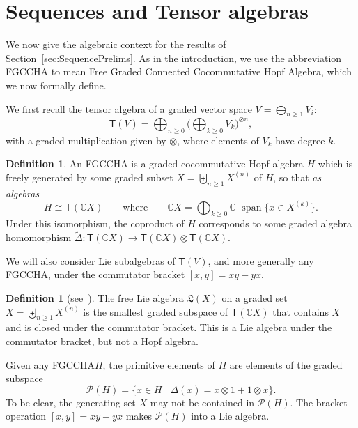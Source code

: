 \documentclass[11pt]{amsart}
\theoremstyle{definition}
\newtheorem{definition}[theorem]{Definition}
\numberwithin{equation}{section}
\def\CC{{\mathbb C}}
\newcommand{\FGCCHA}{\textsf{FGCCHA}\xspace}
\newcommand{\lucas}[1]{\todo[size=\tiny,color=red!50]{#1 \\ \hfill --- Lucas}}
\begin{document}
\section{Sequences and Tensor algebras}
\label{sec:HopfAlgebra}

We now give the algebraic context for the results of Section~\ref{sec:SequencePrelims}.  
As in the introduction, we use the abbreviation \FGCCHA to mean \textsf{F}ree \textsf{G}raded \textsf{C}onnected \textsf{C}ocommutative \textsf{H}opf \textsf{A}lgebra, which we now formally define.

We first recall the tensor algebra of a graded vector space $V = \bigoplus_{n \ge 1} V_{i}$:
\begin{equation}
\label{eq:tensoralg}
\mathsf{T}(V) = \bigoplus_{n \ge 0} \Big( \bigoplus_{k \ge 0} V_{k} \Big)^{\otimes n},
\end{equation}
with a graded multiplication given by $\otimes$, where elements of $V_{k}$ have degree $k$.  

\begin{definition}
\label{def:FGCCHA}
An \FGCCHA is a graded cocommutative Hopf algebra $H$ which is freely generated by some graded subset $X = \biguplus_{n \ge 1} X^{(n)}$ of $H$, so that \textit{as algebras}
\[
H \cong \mathsf{T}(\CC X) 
\qquad\text{where}\qquad
\CC X = \bigoplus_{k \ge 0} \CC\operatorname{-span}\{x \in X^{(k)}\}.
\]
Under this isomorphism, the coproduct of $H$ corresponds to some graded algebra homomorphism $\tilde{\Delta}: \mathsf{T}(\CC X) \to \mathsf{T}(\CC X) \otimes \mathsf{T}(\CC X)$.
\end{definition}

We will also consider Lie subalgebras of $\mathsf{T}(V)$, and more generally any \FGCCHA, under the commutator bracket $[x, y] = xy - yx$.

\begin{definition}[{see~\cite[\S 0.2]{Reutenauer-FreeLieAlgebras}}]
\label{defn:freelie}
The free Lie algebra $\mathfrak{L}(X)$ on a graded set $X = \biguplus_{n\ge 1} X^{(n)}$ is the smallest graded subspace of $\mathsf{T}(\CC X)$ that contains $X$ and is closed under the commutator bracket.  
This is a Lie algebra under the commutator bracket, but not a Hopf algebra.
\end{definition}

Given any \FGCCHA $H$, the primitive elements of $H$ are elements of the graded subspace
\[
\mathcal{P}(H) = \{x \in H \;|\; \Delta(x) = x \otimes 1 + 1 \otimes x\}.
\]
To be clear, the generating set $X$ may not be contained in $\mathcal{P}(H)$.  
The bracket operation $[x,y] = xy - yx$ makes $\mathcal{P}(H)$ into a Lie algebra.  
\end{document}
